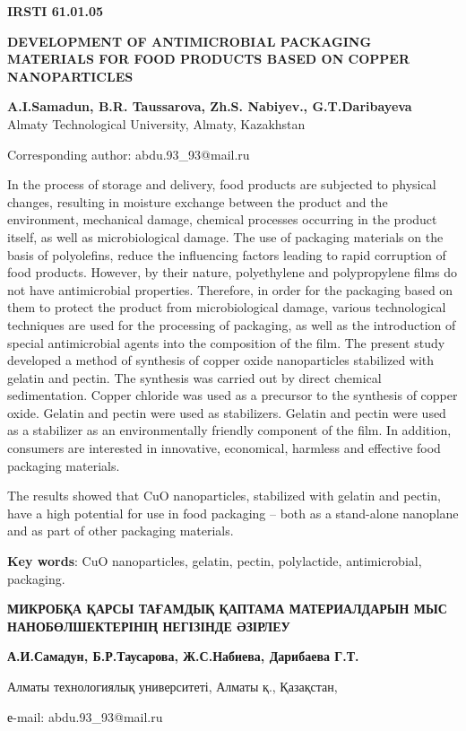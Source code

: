 \newpage
{\bfseries IRSTI 61.01.05}

{\bfseries DEVELOPMENT OF ANTIMICROBIAL PACKAGING MATERIALS FOR FOOD
PRODUCTS BASED ON COPPER NANOPARTICLES}

{\bfseries A.I.Samadun, B.R. Taussarova, Zh.S. Nabiyev., G.T.Daribayeva\\
}Almaty Technological University, Almaty, Kazakhstan

Corresponding author: abdu.93\_93@mail.ru

In the process of storage and delivery, food products are subjected to
physical changes, resulting in moisture exchange between the product and
the environment, mechanical damage, chemical processes occurring in the
product itself, as well as microbiological damage. The use of packaging
materials on the basis of polyolefins, reduce the influencing factors
leading to rapid corruption of food products. However, by their nature,
polyethylene and polypropylene films do not have antimicrobial
properties. Therefore, in order for the packaging based on them to
protect the product from microbiological damage, various technological
techniques are used for the processing of packaging, as well as the
introduction of special antimicrobial agents into the composition of the
film. The present study developed a method of synthesis of copper oxide
nanoparticles stabilized with gelatin and pectin. The synthesis was
carried out by direct chemical sedimentation. Copper chloride was used
as a precursor to the synthesis of copper oxide. Gelatin and pectin were
used as stabilizers. Gelatin and pectin were used as a stabilizer as an
environmentally friendly component of the film. In addition, consumers
are interested in innovative, economical, harmless and effective food
packaging materials.

The results showed that CuO nanoparticles, stabilized with gelatin and
pectin, have a high potential for use in food packaging -- both as a
stand-alone nanoplane and as part of other packaging materials.

{\bfseries Key words}: CuO nanoparticles, gelatin, pectin, polylactide,
antimicrobial, packaging.

{\bfseries МИКРОБҚА ҚАРСЫ ТАҒАМДЫҚ ҚАПТАМА МАТЕРИАЛДАРЫН МЫС
НАНОБӨЛШЕКТЕРІНІҢ НЕГІЗІНДЕ ӘЗІРЛЕУ}

{\bfseries А.И.Самадун, Б.Р.Таусарова, Ж.С.Набиева, Дарибаева Г.Т.}

Алматы технологиялық университеті, Алматы қ., Қазақстан,

е-mail: abdu.93\_93@mail.ru

